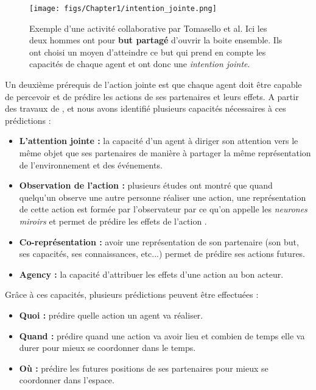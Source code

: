 \documentclass[english,a4paper,11pt,twoside]{StyleThese}
\begin{document}
\begin{figure}[!h]
	\centering
    \texttt{[image: figs/Chapter1/intention\_jointe.png]}
    \caption{Exemple d'une activité collaborative par Tomasello et al. Ici les deux hommes ont pour \textbf{but partagé} d'ouvrir la boite ensemble. Ils ont choisi un moyen d'atteindre ce but qui prend en compte les capacités de chaque agent et ont donc une \textit{intention jointe}.}
    \label{fig:intention_jointe}
\end{figure}

Un deuxième prérequis de l'action jointe est que chaque agent doit être capable de percevoir et de prédire les actions de ses partenaires et leurs effets. A partir des travaux de \cite{sebanz2006joint}, \cite{pacherie2011phenomenology} et \cite{obhi2011moving} nous avons identifié plusieurs capacités nécessaires à ces prédictions :
\begin{itemize}
\item \textbf{L'attention jointe :} la capacité d'un agent à diriger son attention vers le même objet que ses partenaires de manière à partager la même représentation de l'environnement et des événements.
\item \textbf{Observation de l'action :} plusieurs études ont montré que quand quelqu'un observe une autre personne réaliser une action, une représentation de cette action est formée par l'observateur par ce qu'on appelle les \textit{neurones miroirs} et permet de prédire les effets de l'action \cite{rizzolatti2004mirror}.
\item \textbf{Co-représentation :} avoir une représentation de son partenaire (son but, ses capacités, ses connaissances, etc...) permet de prédire ses actions futures.
\item \textbf{Agency :} la capacité d'attribuer les effets d'une action au bon acteur.
\end{itemize}
Grâce à ces capacités, plusieurs prédictions peuvent être effectuées :
\begin{itemize}
\item \textbf{Quoi :} prédire quelle action un agent va réaliser.
\item \textbf{Quand :} prédire quand une action va avoir lieu et combien de temps elle va durer pour mieux se coordonner dans le temps.
\item \textbf{Où :} prédire les futures positions de ses partenaires pour mieux se coordonner dans l'espace.
\end{itemize}
\end{document}
